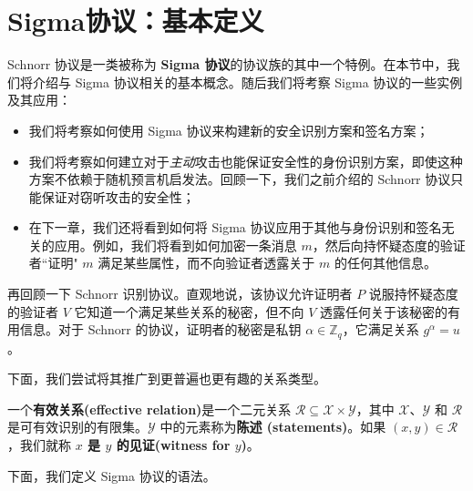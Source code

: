 \section{Sigma协议：基本定义}

Schnorr 协议是一类被称为 \textbf{Sigma 协议}的协议族的其中一个特例。在本节中，我们将介绍与 Sigma 协议相关的基本概念。随后我们将考察 Sigma 协议的一些实例及其应用：
\begin{itemize}
	\item 我们将考察如何使用 Sigma 协议来构建新的安全识别方案和签名方案；
	\item 我们将考察如何建立对于\emph{主动}攻击也能保证安全性的身份识别方案，即使这种方案不依赖于随机预言机启发法。回顾一下，我们之前介绍的 Schnorr 协议只能保证对窃听攻击的安全性；
	\item 在下一章，我们还将看到如何将 Sigma 协议应用于其他与身份识别和签名无关的应用。例如，我们将看到如何加密一条消息 $m$，然后向持怀疑态度的验证者``证明" $m$ 满足某些属性，而不向验证者透露关于 $m$ 的任何其他信息。
\end{itemize}


再回顾一下 Schnorr 识别协议。直观地说，该协议允许证明者 $P$ 说服持怀疑态度的验证者 $V$ 它知道一个满足某些关系的秘密，但不向 $V$ 透露任何关于该秘密的有用信息。对于 Schnorr 的协议，证明者的秘密是私钥 $\alpha\in\mathbb{Z}_q$，它满足关系 $g^\alpha=u$。

下面，我们尝试将其推广到更普遍也更有趣的关系类型。

\begin{definition}[有效关系]
一个\textbf{有效关系(effective relation)}是一个二元关系 $\mathcal{R}\subseteq\mathcal{X}×\mathcal{Y}$，其中 $\mathcal{X}$、$\mathcal{Y}$ 和 $\mathcal{R}$ 是可有效识别的有限集。$\mathcal{Y}$ 中的元素称为\textbf{陈述 (statements)}。如果 $(x,y)\in\mathcal{R}$，我们就称 \textbf{$x$ 是 $y$ 的见证(witness for $y$)}。
\end{definition}

下面，我们定义 Sigma 协议的语法。

